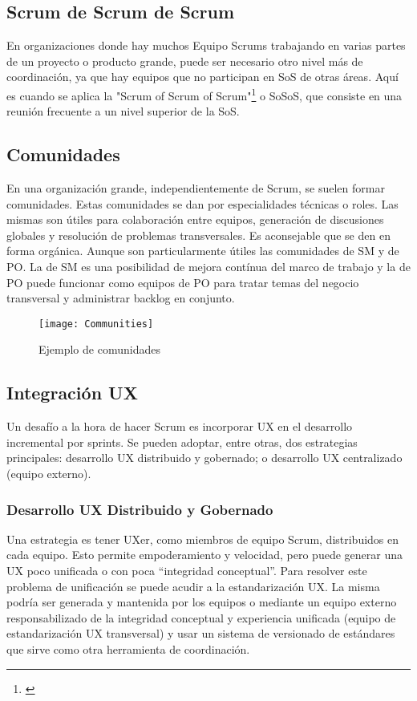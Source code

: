 \subsection{Scrum de Scrum de Scrum}

En organizaciones donde hay muchos Equipo Scrums trabajando en varias partes de un proyecto o producto grande, puede ser necesario otro nivel más de coordinación, ya que hay equipos que no participan en SoS de otras áreas. Aquí es cuando se aplica la "Scrum of Scrum of Scrum"\footnote{\cite{SBOK-2013}} o SoSoS, que consiste en una reunión frecuente a un nivel superior de la SoS.

\subsection{Comunidades}

En una organización grande, independientemente de Scrum, se suelen formar comunidades. Estas comunidades se dan por especialidades técnicas o roles. Las mismas son útiles para colaboración entre equipos, generación de discusiones globales y resolución de problemas transversales. Es aconsejable que se den en forma orgánica. Aunque son particularmente útiles las comunidades de SM y de PO. La de SM es una posibilidad de mejora contínua del marco de trabajo y la de PO puede funcionar como equipos de PO para tratar temas del negocio transversal y administrar backlog en conjunto.

\begin{figure}[h]
  \centering
  \texttt{[image: Communities]}
  \caption{Ejemplo de comunidades}
  \centering
  \label{fig:Communities} %
\end{figure}


\subsection{Integración UX}

Un desafío a la hora de hacer Scrum es incorporar UX en el desarrollo incremental por sprints. Se pueden adoptar, entre otras, dos estrategias principales: desarrollo UX distribuido y gobernado; o desarrollo UX centralizado (equipo externo).

\subsubsection{Desarrollo UX Distribuido y Gobernado}

Una estrategia es tener UXer, como miembros de equipo Scrum, distribuidos en cada equipo. Esto permite empoderamiento y velocidad, pero puede generar una UX poco unificada o con poca “integridad conceptual”. Para resolver este problema de unificación se puede acudir a la estandarización UX. La misma podría ser generada y mantenida por los equipos o mediante un equipo externo responsabilizado de la integridad conceptual y experiencia unificada (equipo de estandarización UX transversal) y usar un sistema de versionado de estándares que sirve como otra herramienta de coordinación.

